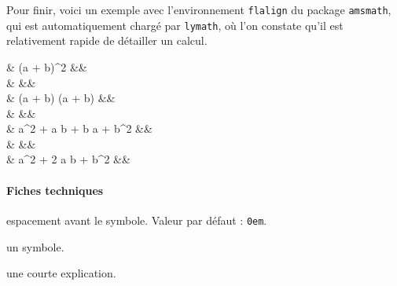 \documentclass[12pt,a4paper]{article}
\begin{document}
Pour finir, voici un exemple avec l'environnement \verb+flalign+ du package \verb+amsmath+, qui est automatiquement chargé par \verb+lymath+, où l'on constate qu'il est relativement rapide de détailler un calcul.

\begin{tcblisting}{}
\begin{flalign*}
    & (a + b)^2
    &&\\
    & 
    &&\\
    & (a + b) (a + b)
    &&\\
    & 
    &&\\
    & a^2 + a b + b a + b^2
    &&\\
    & 
    &&\\
    & a^2 + 2 a b + b^2
    &&\\
\end{flalign*}
\end{tcblisting}



\paragraph{Fiches techniques}


\IDoption{} espacement avant le symbole. Valeur par défaut : \verb+0em+.

 un symbole.

 une courte explication.


\bigskip




\end{document}

